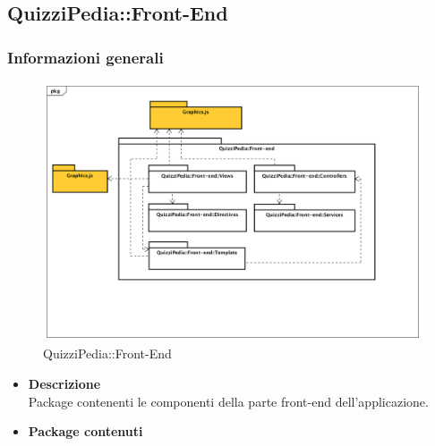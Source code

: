 \subsection{QuizziPedia::Front-End}
\subsubsection{Informazioni generali}
\label{QuizziPedia::Front-End}
\begin{figure}
	\centering
	\includegraphics[scale=0.45]{UML/Package/QuizziPedia_Front-End.png}
	\caption{QuizziPedia::Front-End}
\end{figure}

	\begin{itemize}
		\item \textbf{Descrizione} \\ Package contenenti le componenti della parte front-end dell'applicazione.
		\item \textbf{Package contenuti}
	\end{itemize}
	